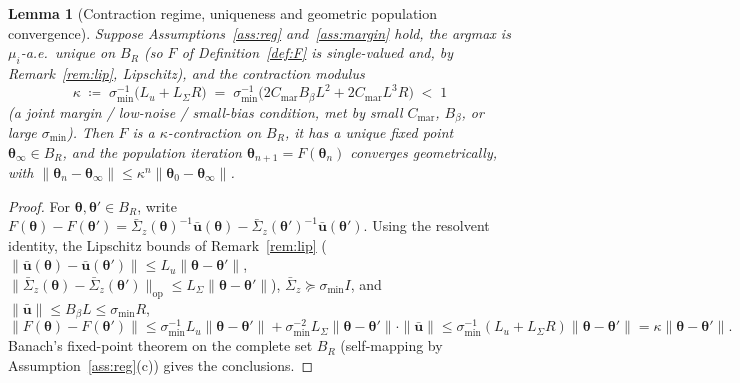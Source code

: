 \documentclass[11pt]{article}
\newtheorem{lemma}[theorem]{Lemma}
\begin{document}
\begin{lemma}[Contraction regime, uniqueness and geometric
population convergence]\label{lem:contraction}
Suppose Assumptions~\ref{ass:reg} and~\ref{ass:margin} hold, the
argmax is $\mu_i$-a.e.\ unique on $B_R$ (so $F$ of
Definition~\ref{def:F} is single-valued and, by
Remark~\ref{rem:lip}, Lipschitz), and the contraction modulus
\begin{equation}
\kappa\;\coloneqq\;\sigma_{\min}^{-1}\bigl(L_u+L_\Sigma R\bigr)
\;=\;\sigma_{\min}^{-1}\bigl(2C_{\mathrm{mar}}B_\beta L^2
+2C_{\mathrm{mar}}L^3 R\bigr)\;<\;1
\label{eq:kappa}
\end{equation}
(a joint margin / low-noise / small-bias condition, met by small
$C_{\mathrm{mar}}$, $B_\beta$, or large $\sigma_{\min}$).  Then $F$ is a
$\kappa$-contraction on $B_R$, it has a \emph{unique} fixed point
$\bm{\theta}_\infty\in B_R$, and the population iteration
$\bm{\theta}_{n+1}=F(\bm{\theta}_n)$ converges geometrically, with
$\|\bm{\theta}_n-\bm{\theta}_\infty\|\leq\kappa^n\|\bm{\theta}_0-\bm{\theta}_\infty\|$.
\end{lemma}

\begin{proof}
For $\bm{\theta},\bm{\theta}'\in B_R$, write
$F(\bm{\theta})-F(\bm{\theta}')
=\bar{\Sigma}_z(\bm{\theta})^{-1}\bar{\bm{u}}(\bm{\theta})
-\bar{\Sigma}_z(\bm{\theta}')^{-1}\bar{\bm{u}}(\bm{\theta}')$.
Using the resolvent identity, the Lipschitz bounds of
Remark~\ref{rem:lip}
($\|\bar{\bm{u}}(\bm{\theta})-\bar{\bm{u}}(\bm{\theta}')\|\leq
L_u\|\bm{\theta}-\bm{\theta}'\|$,
$\|\bar{\Sigma}_z(\bm{\theta})-\bar{\Sigma}_z(\bm{\theta}')\|_{\mathrm{op}}
\leq L_\Sigma\|\bm{\theta}-\bm{\theta}'\|$),
$\bar{\Sigma}_z\succeq\sigma_{\min}I$, and
$\|\bar{\bm{u}}\|\leq B_\beta L\leq\sigma_{\min}R$,
\[
\|F(\bm{\theta})-F(\bm{\theta}')\|
\leq\sigma_{\min}^{-1}L_u\|\bm{\theta}-\bm{\theta}'\|
+\sigma_{\min}^{-2}L_\Sigma\|\bm{\theta}-\bm{\theta}'\|\cdot\|\bar{\bm{u}}\|
\leq\sigma_{\min}^{-1}(L_u+L_\Sigma R)\|\bm{\theta}-\bm{\theta}'\|
=\kappa\|\bm{\theta}-\bm{\theta}'\|.
\]
Banach's fixed-point theorem on the complete set $B_R$ (self-mapping by
Assumption~\ref{ass:reg}(c)) gives the conclusions.
\end{proof}
\end{document}
